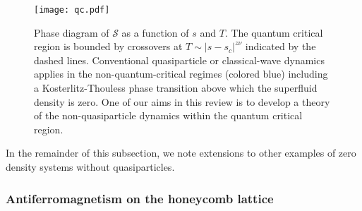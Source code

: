 \documentclass[10pt, oneside]{book}
\begin{document}
\begin{doublespace}
\begin{figure}
\centering
\texttt{[image: qc.pdf]}
\caption{\label{fig:qc} Phase diagram of $\mathcal{S}$ as a function of $s$ and $T$. The quantum critical region is bounded by crossovers at $T \sim |s-s_c|^{z \nu}$ indicated by the dashed lines. Conventional quasiparticle or classical-wave dynamics applies in the non-quantum-critical regimes 
(colored blue) including a Kosterlitz-Thouless phase transition above which the superfluid density is zero. One of our aims in this review is to develop a theory
of the non-quasiparticle dynamics within the quantum critical region.
}
\end{figure}

In the remainder of this subsection, we note  extensions to other examples of zero density systems without quasiparticles. 

\subsubsection{Antiferromagnetism on the honeycomb lattice}
\label{sec:honeycomb}




\end{doublespace}
\end{document}
